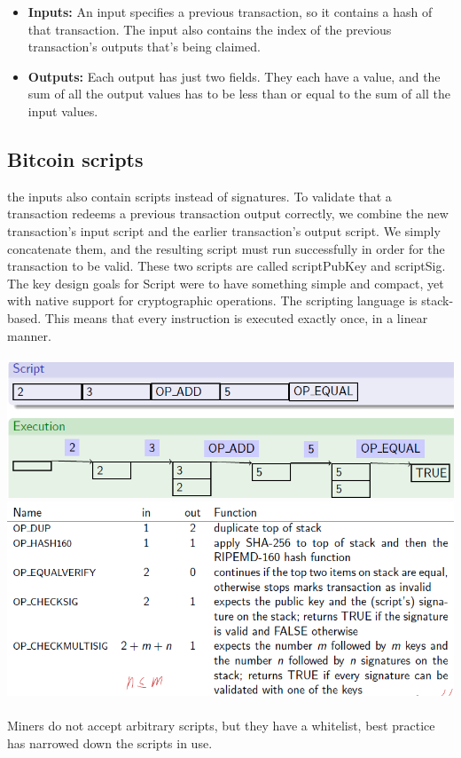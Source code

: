 \documentclass{article}
\begin{document}
\begin{itemize}
\begin{itemize}
\item \textbf{Inputs: }An input specifies a previous transaction, so it contains a hash of that transaction. The input also contains the index of the previous transaction’s outputs that’s being claimed.
\item \textbf{Outputs: }Each output has just two fields. They each have a value, and the sum of all the output values has to be less than or equal to the sum of all the input values.
\end{itemize}
\end{itemize}

\subsection{Bitcoin scripts}
the inputs also contain scripts instead of signatures.
To validate that a transaction redeems a previous transaction output correctly, we combine the new transaction’s input script and the earlier transaction’s output script. We simply concatenate them, and the resulting script must run successfully in order for the transaction to be valid. These two scripts are called scriptPubKey and scriptSig. The key design goals for Script were to have something simple and compact, yet with native support for cryptographic operations. The scripting language is stack-based. This means that every instruction is executed exactly once, in a linear manner. \\\\
\includegraphics[scale=0.6]{20.png}
\includegraphics[scale=0.6]{21.png}\\\\
Miners do not accept arbitrary scripts, but they have a whitelist, best practice has narrowed down the scripts in use.\\
\end{document}
